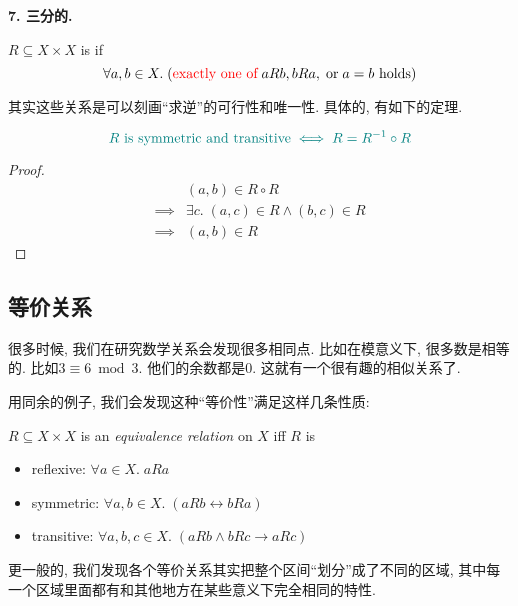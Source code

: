 \textbf{7. 三分的.}

\begin{definition}
  $R \subseteq X \times X$ is  if
  \[
    \forall a, b \in X.\;
      (\text{\textcolor{red}{exactly one of}}\; a R b, b R a, \;\text{or}\; a = b \text{ holds})
  \]
\end{definition}

其实这些关系是可以刻画``求逆''的可行性和唯一性. 具体的, 有如下的定理.

\begin{theorem}
  \[
    \textcolor{teal}{R \text{ is symmetric and transitive} \iff R = R^{-1} \circ R}
  \]
\end{theorem}

\begin{proof}
  \setcounter{equation}{0}
  \begin{align*}
    &(a, b) \in R \circ R \\[6pt]
    \implies& \exists c.\; (a, c) \in R \land (b, c) \in R \\
    \implies& (a, b) \in R
  \end{align*}
\end{proof}

\subsection{等价关系}

很多时候, 我们在研究数学关系会发现很多相同点. 比如在模意义下, 很多数是相等的. 比如$3 \equiv 6 \bmod 3$. 他们的余数都是$0$. 这就有一个很有趣的相似关系了. 

用同余的例子, 我们会发现这种``等价性''满足这样几条性质: 

\begin{definition}
  $R \subseteq X \times X$ is an {\it equivalence relation} on $X$ iff $R$ is
  \begin{itemize}
    \item reflexive: $\forall a \in X.\; a R a$
    \item symmetric: $\forall a, b \in X.\; (a R b \leftrightarrow b R a)$
    \item transitive: $\forall a, b, c \in X.\; (a R b \land b R c \to a R c)$
  \end{itemize}
\end{definition}

更一般的, 我们发现各个等价关系其实把整个区间``划分''成了不同的区域, 其中每一个区域里面都有和其他地方在某些意义下完全相同的特性. 

